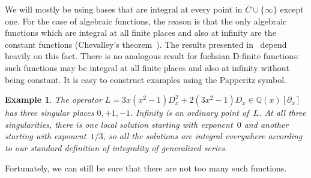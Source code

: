 \documentclass{sig-alternate}
\newtheorem{example}[theorem]{Example}
\let\set\mathbb
\begin{document}
We will mostly be using bases that are integral at every point in $\bar C\cup\{\infty\}$ except one.
For the case of algebraic functions, the reason is that the only algebraic functions which are
integral at all finite places and also at infinity are the constant functions (Chevalley's
theorem~\cite[page 9, Corollary 3]{Chevalley1951}). The results presented in~\cite{chen16}
depend heavily on this fact. There is no analogous result for fuchsian D-finite functions: such
functions may be integral at all finite places and also at infinity without being constant.
It is easy to construct examples using the Papperitz symbol.

\begin{example}
  The operator $L = 3 x(x^2-1) D_x^2 + 2 (3x^2 - 1) D_x\in\set Q(x)[\partial_x]$
  has three singular places $0,+1,-1$. Infinity is an ordinary point of~$L$.
  At all three singularities, there is one local solution starting with exponent~$0$
  and another starting with exponent~$1/3$, so all the solutions are integral
  everywhere according to our standard definition of integrality of generalized
  series.
\end{example}

Fortunately, we can still be sure that there are not too many such functions.
\end{document}
